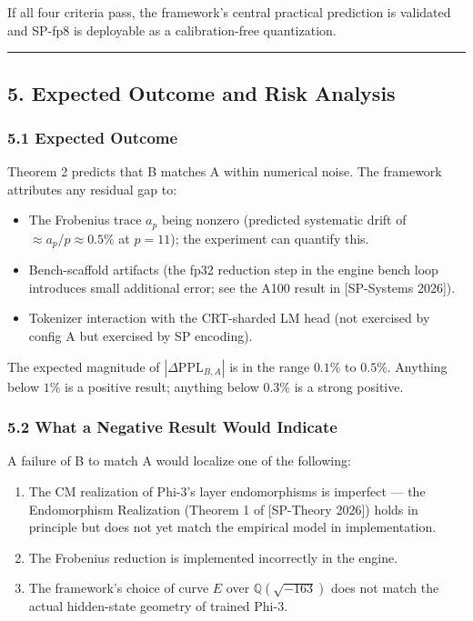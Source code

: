 \documentclass[
  11pt,
]{article}
\providecommand{\tightlist}{%
  \setlength{\itemsep}{0pt}\setlength{\parskip}{0pt}}
\begin{document}
If all four criteria pass, the framework's central practical prediction
is validated and SP-fp8 is deployable as a calibration-free
quantization.

\begin{center}\rule{0.5\linewidth}{0.5pt}\end{center}

\hypertarget{expected-outcome-and-risk-analysis}{%
\subsection{5. Expected Outcome and Risk
Analysis}\label{expected-outcome-and-risk-analysis}}

\hypertarget{expected-outcome}{%
\subsubsection{5.1 Expected Outcome}\label{expected-outcome}}

Theorem 2 predicts that B matches A within numerical noise. The
framework attributes any residual gap to:

\begin{itemize}
\tightlist
\item
  The Frobenius trace \(a_p\) being nonzero (predicted systematic drift
  of \(\approx a_p / p \approx 0.5\%\) at \(p = 11\)); the experiment
  can quantify this.
\item
  Bench-scaffold artifacts (the fp32 reduction step in the engine bench
  loop introduces small additional error; see the A100 result in
  {[}SP-Systems 2026{]}).
\item
  Tokenizer interaction with the CRT-sharded LM head (not exercised by
  config A but exercised by SP encoding).
\end{itemize}

The expected magnitude of \(|\Delta\mathrm{PPL}_{B,A}|\) is in the range
\(0.1\%\) to \(0.5\%\). Anything below \(1\%\) is a positive result;
anything below \(0.3\%\) is a strong positive.

\hypertarget{what-a-negative-result-would-indicate}{%
\subsubsection{5.2 What a Negative Result Would
Indicate}\label{what-a-negative-result-would-indicate}}

A failure of B to match A would localize one of the following:

\begin{enumerate}
\def\labelenumi{\arabic{enumi}.}
\tightlist
\item
  The CM realization of Phi-3's layer endomorphisms is imperfect --- the
  Endomorphism Realization (Theorem 1 of {[}SP-Theory 2026{]}) holds in
  principle but does not yet match the empirical model in
  implementation.
\item
  The Frobenius reduction is implemented incorrectly in the engine.
\item
  The framework's choice of curve \(E\) over \(\mathbb{Q}(\sqrt{-163})\)
  does not match the actual hidden-state geometry of trained Phi-3.
\end{enumerate}
\end{document}
